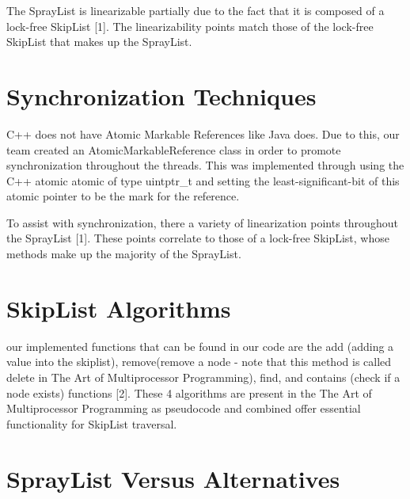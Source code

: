 \documentclass[conference]{IEEEtran}
\begin{document}
The SprayList is linearizable partially due to the fact that it is composed of a lock-free SkipList [1]. The linearizability points match those of the lock-free SkipList that makes up the SprayList.


\section {Synchronization Techniques}

C++  does not have Atomic Markable References like Java does. Due to this, our team created an AtomicMarkableReference class in order to promote synchronization throughout the threads. This was implemented through using the C++ atomic atomic of type uintptr\_t  and setting the least-significant-bit of this atomic pointer to be the mark for the reference.


To assist with synchronization, there a variety of linearization points throughout the SprayList [1]. These points correlate to those of a lock-free SkipList, whose methods make up the majority of the SprayList.

\section {SkipList Algorithms}

our implemented functions that can be found in our code are the add (adding a value into the skiplist), remove(remove a node - note that this method is called delete in The Art of Multiprocessor Programming), find, and contains (check if a node exists) functions [2]. These 4 algorithms are present in the The Art of Multiprocessor Programming as pseudocode and combined offer essential functionality for SkipList traversal.


\section {SprayList Versus Alternatives}
\end{document}
